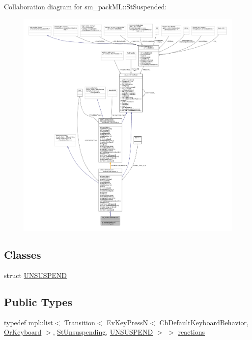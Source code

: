 Collaboration diagram for sm\+\_\+pack\+ML\+:\+:St\+Suspended\+:
\nopagebreak
\begin{figure}[H]
\begin{center}
\leavevmode
\includegraphics[width=350pt]{structsm__packML_1_1StSuspended__coll__graph}
\end{center}
\end{figure}
\subsection*{Classes}
\begin{DoxyCompactItemize}
\item 
struct \hyperlink{structsm__packML_1_1StSuspended_1_1UNSUSPEND}{U\+N\+S\+U\+S\+P\+E\+ND}
\end{DoxyCompactItemize}
\subsection*{Public Types}
\begin{DoxyCompactItemize}
\item 
typedef mpl\+::list$<$ Transition$<$ Ev\+Key\+PressN$<$ Cb\+Default\+Keyboard\+Behavior, \hyperlink{classsm__packML_1_1OrKeyboard}{Or\+Keyboard} $>$, \hyperlink{structsm__packML_1_1StUnsuspending}{St\+Unsuspending}, \hyperlink{structsm__packML_1_1StSuspended_1_1UNSUSPEND}{U\+N\+S\+U\+S\+P\+E\+ND} $>$ $>$ \hyperlink{structsm__packML_1_1StSuspended_a8bdc8aa52c97f3ac7a1bcfbe974a6f60}{reactions}
\end{DoxyCompactItemize}
